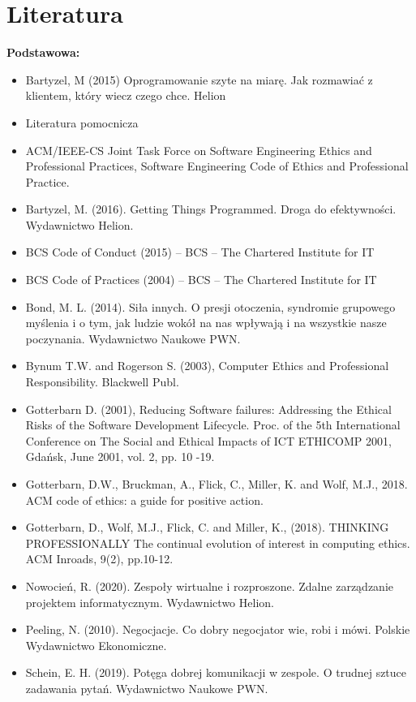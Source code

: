 \documentclass[12pt, a4paper]{article}
\begin{document}
\section{Literatura}

\textbf{Podstawowa:}
\begin{itemize}
  \item Bartyzel, M (2015) Oprogramowanie szyte na miarę. Jak rozmawiać z klientem, który wiecz czego chce. Helion
  \item Literatura pomocnicza
  \item ACM/IEEE-CS Joint Task Force on Software Engineering Ethics and Professional Practices, Software Engineering Code of Ethics and Professional Practice.
  \item Bartyzel, M. (2016). Getting Things Programmed. Droga do efektywności. Wydawnictwo Helion.
  \item BCS Code of Conduct (2015) – BCS – The Chartered Institute for IT
  \item BCS Code of Practices (2004) – BCS – The Chartered Institute for IT
  \item Bond, M. L. (2014). Siła innych. O presji otoczenia, syndromie grupowego myślenia i o tym, jak ludzie wokół na nas wpływają i na wszystkie nasze poczynania. Wydawnictwo Naukowe PWN.
  \item Bynum T.W. and Rogerson S. (2003), Computer Ethics and Professional Responsibility. Blackwell Publ.
  \item Gotterbarn D. (2001), Reducing Software failures: Addressing the Ethical Risks of the Software Development Lifecycle. Proc. of the 5th International Conference on The Social and Ethical Impacts of ICT ETHICOMP 2001, Gdańsk, June 2001, vol. 2, pp. 10 -19.
  \item Gotterbarn, D.W., Bruckman, A., Flick, C., Miller, K. and Wolf, M.J., 2018. ACM code of ethics: a guide for positive action.
  \item Gotterbarn, D., Wolf, M.J., Flick, C. and Miller, K., (2018). THINKING PROFESSIONALLY The continual evolution of interest in computing ethics. ACM Inroads, 9(2), pp.10-12.
  \item Nowocień, R. (2020). Zespoły wirtualne i rozproszone. Zdalne zarządzanie projektem informatycznym.  Wydawnictwo Helion.
  \item Peeling, N. (2010). Negocjacje. Co dobry negocjator wie, robi i mówi. Polskie Wydawnictwo Ekonomiczne.
  \item Schein, E. H. (2019). Potęga dobrej komunikacji w zespole. O trudnej sztuce zadawania pytań.   Wydawnictwo Naukowe PWN.

\end{itemize}
\end{document}
